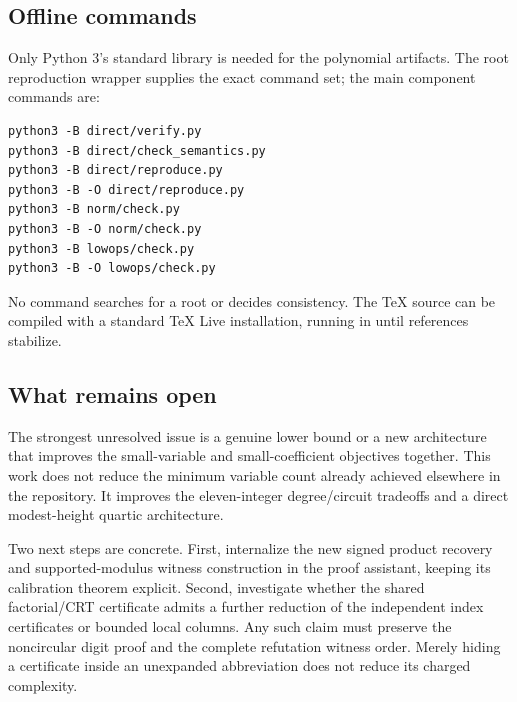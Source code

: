 \subsection{Offline commands}
Only Python 3's standard library is needed for the polynomial artifacts.
The root reproduction wrapper supplies the exact command set; the main
component commands are:
\begin{lstlisting}
python3 -B direct/verify.py
python3 -B direct/check_semantics.py
python3 -B direct/reproduce.py
python3 -B -O direct/reproduce.py
python3 -B norm/check.py
python3 -B -O norm/check.py
python3 -B lowops/check.py
python3 -B -O lowops/check.py
\end{lstlisting}
No command searches for a root or decides consistency. The TeX source can
be compiled with a standard TeX Live installation, running
in  until references stabilize.

\subsection{What remains open}
The strongest unresolved issue is a genuine lower bound or a new
architecture that improves the small-variable and small-coefficient
objectives together. This work does not reduce the minimum variable
count already achieved elsewhere in the repository. It improves the
eleven-integer degree/circuit tradeoffs and a direct modest-height
quartic architecture.

Two next steps are concrete. First, internalize the new signed product
recovery and supported-modulus witness construction in the proof
assistant, keeping its calibration theorem explicit. Second, investigate
whether the shared factorial/CRT certificate admits a further reduction
of the independent index certificates or bounded local columns. Any such
claim must preserve the noncircular digit proof and the complete
refutation witness order. Merely hiding a certificate inside an
unexpanded abbreviation does not reduce its charged complexity.

